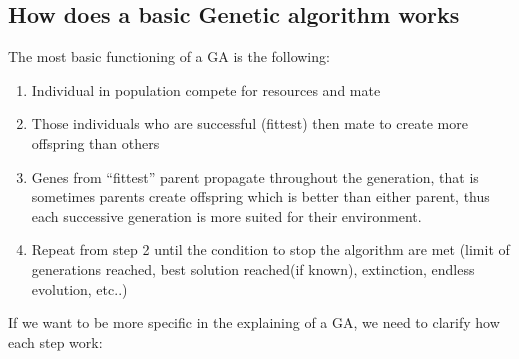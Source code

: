 \documentclass{article}
\begin{document}
	\subsection{How does a basic Genetic algorithm works}
	The most basic functioning of a GA is the following:
	\begin{enumerate}
		\item Individual in population compete for resources and mate
		\item Those individuals who are successful (fittest) then mate to create more offspring than others
		\item Genes from “fittest” parent propagate throughout the generation, that is sometimes parents create offspring which is better than either parent, thus each successive generation is more suited for their environment.
		\item Repeat from step 2 until the condition to stop the algorithm are met (limit of generations reached, best solution reached(if known), extinction, endless evolution, etc..)   
	\end{enumerate}
	If we want to be more specific in the explaining of a GA, we need to clarify how each step work: 
\end{document}
